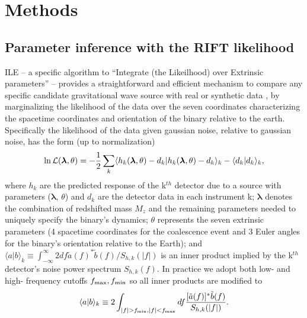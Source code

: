 \documentclass[twocolumn,prd,nofootinbib]{revtex4}
\newcommand\ILE{ILE}
\begin{document}
\section{Methods}
\label{sec:methods}

\subsection{Parameter inference with the RIFT likelihood}
\ILE{}  -- a specific algorithm to ``Integrate (the Likeilhood) over Extrinsic parameters'' -- provides a straightforward and efficient mechanism to compare any specific candidate gravitational wave source with
real or synthetic data   \cite{gwastro-PE-AlternativeArchitectures,NRPaper,2017PhRvD..96j4041L,2017CQGra..34n4002O},
by marginalizing the likelihood of the data over the seven coordinates characterizing the spacetime coordinates and
orientation of the binary relative to the earth.  
Specifically the likelihood of the data given gaussian noise, relative to gaussian noise, has the form  (up to normalization)
\begin{equation}
\label{eq:lnL}
\ln {\cal L}(\bm{\lambda} ,\theta )=-\frac{1}{2}\sum\limits_{k}\langle h_{k}(\bm{\lambda} ,\theta )-d_{k} |h_{k}(\bm{\lambda} ,\theta )-d_{k}\rangle _{k}-\langle d_{k}|d_{k}\rangle _{k},
\end{equation}
where $h_{k}$ are the predicted response of the k$^{th}$ detector due to a source with parameters ($\bm{\lambda}$, $\theta$) and
$d_{k}$ are the detector data in each instrument k; $\bm{\lambda}$ denotes the combination of redshifted mass $M_{z}$ and the
remaining parameters needed to uniquely specify the binary's dynamics; $\theta$ represents the
seven extrinsic parameters (4 spacetime coordinates for the coalescence event and 3 Euler angles for the binary's
orientation relative to the Earth); and $\langle a|b\rangle_{k}\equiv
\int_{-\infty}^{\infty}2df\tilde{a}(f)^{*}\tilde{b}(f)/S_{h,k}(|f|)$ is an inner product implied by the k$^{th}$ detector's
noise power spectrum $S_{h,k}(f)$. 
In practice we adopt both  low- and high- frequency cutoffs $f_{\rm max},f_{\rm min}$ so all inner products are modified to
\begin{equation}
\label{eq:overlap}
\langle a|b\rangle_{k}\equiv 2 \int_{|f|>f_{\rm min},|f|<f_{\rm max}}df\frac{[\tilde{a}(f)]^{*}\tilde{b}(f)}{S_{h,k}(|f|)}.
\end{equation}
\end{document}

